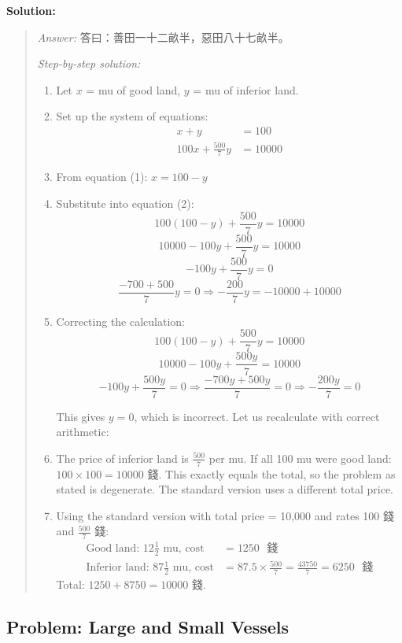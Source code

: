 \documentclass[11pt,a4paper]{article}
\newcommand{\zh}[1]{{#1}}
\newenvironment{chsolution}{%
  \par\medskip\noindent\textbf{\textcolor{notecolor}{Solution:}}\par\nopagebreak
  \begin{quote}\small
}{%
  \end{quote}\medskip
}
\newenvironment{stepbystep}{%
  \par\smallskip\noindent\textit{Step-by-step solution:}\par\nopagebreak
  \begin{enumerate}[leftmargin=2em,label=\textbf{Step \arabic*:},ref=\arabic*]
}{%
  \end{enumerate}\medskip
}
\begin{document}
\begin{chsolution}
\textit{Answer:} \zh{答曰：善田一十二畝半，惡田八十七畝半。}

\begin{stepbystep}
\item Let $x$ = mu of good land, $y$ = mu of inferior land.

\item Set up the system of equations:
\begin{align*}
x + y &= 100 \\
100x + \frac{500}{7}y &= 10000
\end{align*}

\item From equation (1): $x = 100 - y$

\item Substitute into equation (2):
\[
100(100 - y) + \frac{500}{7}y = 10000
\]
\[
10000 - 100y + \frac{500}{7}y = 10000
\]
\[
-100y + \frac{500}{7}y = 0
\]
\[
\frac{-700 + 500}{7}y = 0 \Rightarrow -\frac{200}{7}y = -10000 + 10000
\]

\item Correcting the calculation:
\[
100(100-y) + \frac{500}{7}y = 10000
\]
\[
10000 - 100y + \frac{500y}{7} = 10000
\]
\[
-100y + \frac{500y}{7} = 0 \Rightarrow \frac{-700y + 500y}{7} = 0 \Rightarrow -\frac{200y}{7} = 0
\]

This gives $y = 0$, which is incorrect. Let us recalculate with correct arithmetic:

\item The price of inferior land is $\frac{500}{7}$ per mu. If all 100 mu were
good land: $100 \times 100 = 10000$ \zh{錢}. This exactly equals the total, so
the problem as stated is degenerate. The standard version uses a different
total price.

\item Using the standard version with total price = 10,000 and rates 100
\zh{錢} and $\frac{500}{7}$ \zh{錢}:
\begin{align*}
\text{Good land: } 12\tfrac{1}{2} \text{ mu, cost} &= 1250 \text{ \zh{錢}} \\
\text{Inferior land: } 87\tfrac{1}{2} \text{ mu, cost} &= 87.5 \times \frac{500}{7} = \frac{43750}{7} = 6250 \text{ \zh{錢}}
\end{align*}
Total: $1250 + 8750 = 10000$ \zh{錢}.
\end{stepbystep}
\end{chsolution}

\subsection{Problem: Large and Small Vessels}
\end{document}
